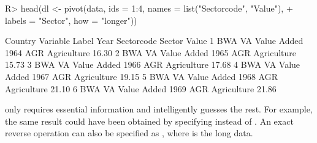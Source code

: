 \documentclass[article]{jss} %
\newcommand{\fct}[1]{\code{#1()}}
\begin{document}
\begin{Schunk}
\begin{Sinput}
R> head(dl <- pivot(data, ids = 1:4, names = list("Sectorcode", "Value"),
+    labels = "Sector", how = "longer"))
\end{Sinput}
\begin{Soutput}
  Country Variable       Label Year Sectorcode      Sector Value
1     BWA       VA Value Added 1964        AGR Agriculture 16.30
2     BWA       VA Value Added 1965        AGR Agriculture 15.73
3     BWA       VA Value Added 1966        AGR Agriculture 17.68
4     BWA       VA Value Added 1967        AGR Agriculture 19.15
5     BWA       VA Value Added 1968        AGR Agriculture 21.10
6     BWA       VA Value Added 1969        AGR Agriculture 21.86
\end{Soutput}
\end{Schunk}
%
\fct{pivot} only requires essential information and intelligently guesses the rest. For example, the same result could have been obtained by specifying  instead of . An exact reverse operation can also be specified as , where  is the long data. \newline
\end{document}
